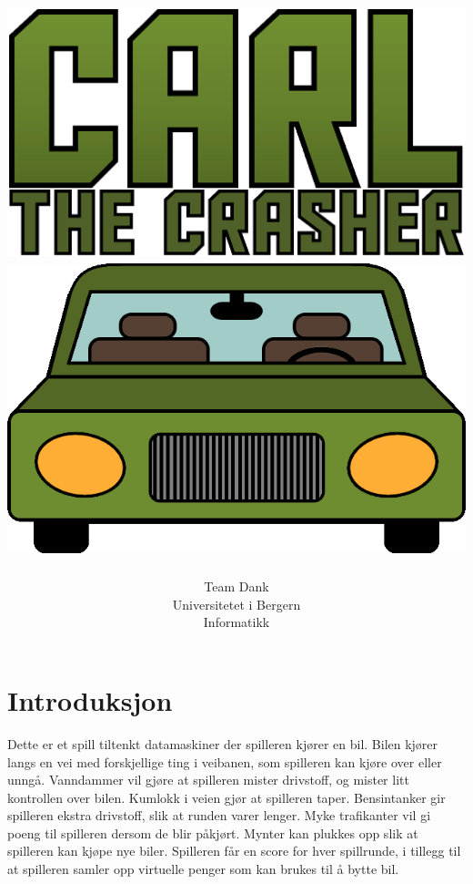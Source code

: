\documentclass[paper=a4]{article}
\begin{document}
\title{ \normalsize \includegraphics[scale=0.5]{images/CarGameLogo.png}
	\\
	\includegraphics[scale=0.5]{images/menu_car.png}
}
\author{Team Dank \\
Universitetet i Bergern \\
Informatikk}
\maketitle
\newpage

\section{Introduksjon}
Dette er et spill tiltenkt datamaskiner der spilleren kjører en bil.
Bilen kjører langs en vei med forskjellige ting i veibanen, som spilleren kan kjøre over eller unngå.
Vanndammer vil gjøre at spilleren mister drivstoff, og mister litt kontrollen over bilen.
Kumlokk i veien gjør at spilleren taper.
Bensintanker gir spilleren ekstra drivstoff, slik at runden varer lenger.
Myke trafikanter vil gi poeng til spilleren dersom de blir påkjørt.
Mynter kan plukkes opp slik at spilleren kan kjøpe nye biler.
Spilleren får en score for hver spillrunde, i tillegg til at spilleren samler opp virtuelle penger som kan brukes til å bytte bil.
\newpage
\end{document}
